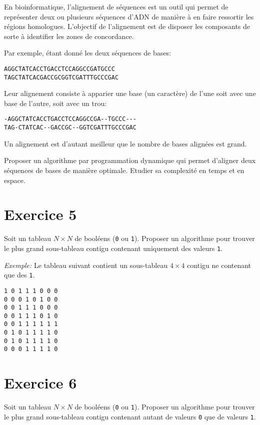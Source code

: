 \documentclass[a4paper,10pt]{article}
\begin{document}
En bioinformatique, l'alignement de séquences est un outil qui permet de représenter
deux ou plusieurs séquences d'ADN de manière à en faire ressortir les régions
homologues. L'objectif de l'alignement est de disposer les composants de sorte
à identifier les zones de concordance.

Par exemple, étant donné les deux séquences de bases:

\begin{verbatim}
AGGCTATCACCTGACCTCCAGGCCGATGCCC
TAGCTATCACGACCGCGGTCGATTTGCCCGAC
\end{verbatim}

Leur alignement consiste à apparier une base (un caractère) de l'une
soit avec une base de l'autre, soit avec un trou:

\begin{verbatim}
-AGGCTATCACCTGACCTCCAGGCCGA--TGCCC---
TAG-CTATCAC--GACCGC--GGTCGATTTGCCCGAC
\end{verbatim}

Un alignement est d'autant meilleur que le nombre de bases alignées est grand.

Proposer un algorithme par programmation dynamique qui permet
d'aligner deux séquences de bases de manière optimale. Etudier sa
complexité en temps et en espace.


\section*{Exercice 5}

Soit un tableau $N \times N$ de booléens (\texttt{0} ou \texttt{1}). Proposer un algorithme pour trouver le plus grand sous-tableau contigu contenant uniquement des valeurs \texttt{1}.

\textit{Exemple:} Le tableau suivant contient un sous-tableau $4 \times 4$ contigu ne contenant que des \texttt{1}.

\begin{verbatim}
1 0 1 1 1 0 0 0
0 0 0 1 0 1 0 0
0 0 1 1 1 0 0 0
0 0 1 1 1 0 1 0
0 0 1 1 1 1 1 1
0 1 0 1 1 1 1 0
0 1 0 1 1 1 1 0
0 0 0 1 1 1 1 0
\end{verbatim}


\section*{Exercice 6}

Soit un tableau $N \times N$ de booléens (\texttt{0} ou \texttt{1}). Proposer un algorithme pour trouver le plus grand sous-tableau contigu contenant autant de valeurs \texttt{0} que de valeurs \texttt{1}.
\end{document}
